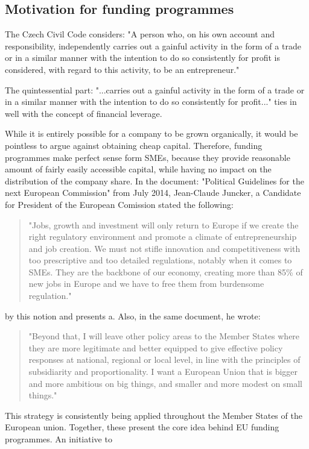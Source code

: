 \documentclass[12pt,oneside]{fithesis2}
\begin{document}
    \subsection{Motivation for funding programmes}
    The Czech Civil Code considers: "A person who, on his own account and responsibility, independently carries out a gainful activity in the form of a trade or in a similar manner with the intention to do so consistently for profit is considered, with regard to this activity, to be an entrepreneur."\cite{entrepreneur-law}
    \par
    The quintessential part: "...carries out a gainful activity in the form of a trade or in a similar manner with the intention to do so consistently for profit..." ties in well with the concept of financial leverage.
    \par
    While it is entirely possible for a company to be grown organically, it would be pointless to argue against obtaining cheap capital. Therefore, funding programmes make perfect sense form SMEs, because they provide reasonable amount of fairly easily accessible capital, while having no impact on the distribution of the company share.
    \newline\newline
    In the document: "Political Guidelines for the next European Commission" from  July 2014, Jean-Claude Juncker, a Candidate for President of the European Comission stated the following: \blockquote{"Jobs, growth and investment will only return to Europe if we create the right regulatory environment and promote a climate of entrepreneurship and job creation. We must not stifle innovation and competitiveness with too prescriptive and too detailed regulations, notably when it comes to SMEs. They are the backbone of our economy, creating more than 85\% of new jobs in Europe and we have to free them from burdensome regulation."\cite{juncker-political-guidelines}}
     by this notion and presents a.
    \newline\newline
    Also, in the same document, he wrote: \blockquote{"Beyond that, I will leave other policy areas to the Member States where they are more legitimate and better equipped to give effective policy responses at national, regional or local level, in line with the principles of subsidiarity and proportionality. I want a European Union that is bigger and more ambitious on big things, and smaller and more modest on small things."}
    This strategy is consistently being applied throughout the Member States of the European union.
    Together, these present the core idea behind EU funding programmes. An initiative to 
\end{document}
